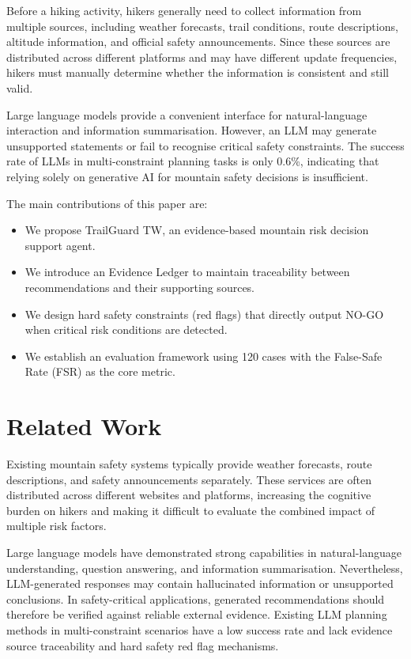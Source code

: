 \documentclass[conference]{IEEEtran}
\begin{document}
Before a hiking activity, hikers generally need to collect information from multiple sources, including weather forecasts, trail conditions, route descriptions, altitude information, and official safety announcements. Since these sources are distributed across different platforms and may have different update frequencies, hikers must manually determine whether the information is consistent and still valid.

Large language models provide a convenient interface for natural-language interaction and information summarisation. However, an LLM may generate unsupported statements or fail to recognise critical safety constraints. The success rate of LLMs in multi-constraint planning tasks is only 0.6\%, indicating that relying solely on generative AI for mountain safety decisions is insufficient.

The main contributions of this paper are:
\begin{itemize}
    \item We propose TrailGuard TW, an evidence-based mountain risk decision support agent.
    \item We introduce an Evidence Ledger to maintain traceability between recommendations and their supporting sources.
    \item We design hard safety constraints (red flags) that directly output NO-GO when critical risk conditions are detected.
    \item We establish an evaluation framework using 120 cases with the False-Safe Rate (FSR) as the core metric.
\end{itemize}

\section{Related Work}
Existing mountain safety systems typically provide weather forecasts, route descriptions, and safety announcements separately. These services are often distributed across different websites and platforms, increasing the cognitive burden on hikers and making it difficult to evaluate the combined impact of multiple risk factors.

Large language models have demonstrated strong capabilities in natural-language understanding, question answering, and information summarisation. Nevertheless, LLM-generated responses may contain hallucinated information or unsupported conclusions. In safety-critical applications, generated recommendations should therefore be verified against reliable external evidence. Existing LLM planning methods in multi-constraint scenarios have a low success rate and lack evidence source traceability and hard safety red flag mechanisms.
\end{document}
